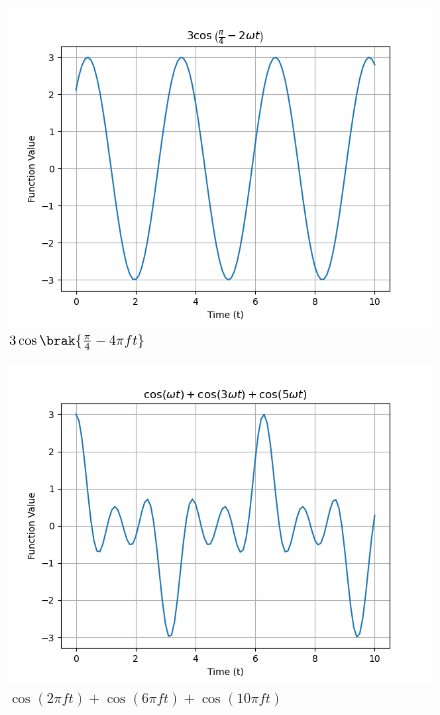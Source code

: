 \documentclass[journal,12pt,onecolumn]{IEEEtran}
\theoremstyle{remark}
\begin{document}
\begin{figure}[h!]
    \centering
    \includegraphics[width=\columnwidth]{ncert-physics/11/14/4/figs/11.14.4 f3.png}
    \caption{$3\cos\brak{\frac{\pi}{4}- 4\pi f t}$}
    \label{fig:11.14.4.3}
\end{figure}
\begin{figure}[h!]
    \centering
    \includegraphics[width=\columnwidth]{ncert-physics/11/14/4/figs/11.14.4 f4.png}
    \caption{$\cos(2\pi f t)+\cos(6\pi  f t)+\cos(10\pi  f t)$}
    \label{fig:11.14.4.4}
\end{figure}
\end{document}
